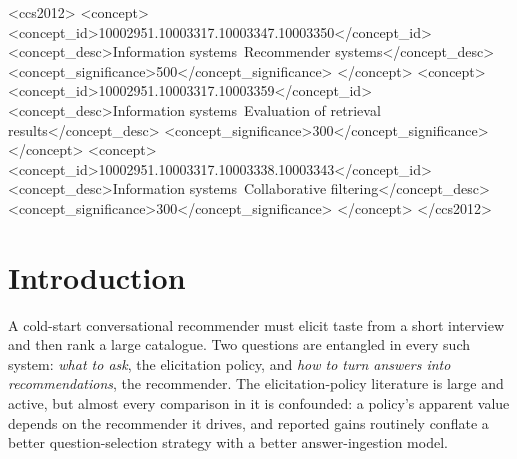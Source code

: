 \documentclass[acmsmall,review,anonymous]{acmart}
\begin{document}
\begin{CCSXML}
<ccs2012>
<concept>
<concept_id>10002951.10003317.10003347.10003350</concept_id>
<concept_desc>Information systems~Recommender systems</concept_desc>
<concept_significance>500</concept_significance>
</concept>
<concept>
<concept_id>10002951.10003317.10003359</concept_id>
<concept_desc>Information systems~Evaluation of retrieval results</concept_desc>
<concept_significance>300</concept_significance>
</concept>
<concept>
<concept_id>10002951.10003317.10003338.10003343</concept_id>
<concept_desc>Information systems~Collaborative filtering</concept_desc>
<concept_significance>300</concept_significance>
</concept>
</ccs2012>
\end{CCSXML}



\maketitle

\section{Introduction}\label{sec:intro}

A cold-start conversational recommender must elicit taste from a short interview and then rank a large catalogue. Two questions are entangled in every such system: \emph{what to ask}, the elicitation policy, and \emph{how to turn answers into recommendations}, the recommender. The elicitation-policy literature is large and active, but almost every comparison in it is confounded: a policy's apparent value depends on the recommender it drives, and reported gains routinely conflate a better question-selection strategy with a better answer-ingestion model.
\end{document}
